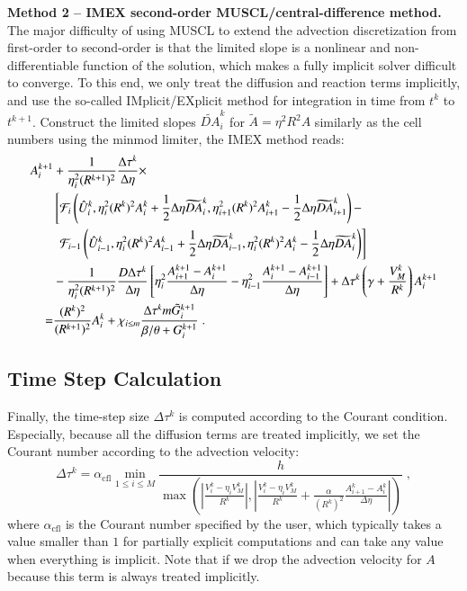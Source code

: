 \documentclass{amsart}
\theoremstyle{definition}
\theoremstyle{remark}
\numberwithin{equation}{section}
\numberwithin{figure}{section}
\newcommand{\abs}[1]{\left|#1\right|}
\begin{document}
\noindent
{\bf Method 2 -- IMEX second-order MUSCL/central-difference method.}
The major difficulty of using MUSCL to extend the advection discretization from first-order to second-order is that the limited slope is a nonlinear and non-differentiable function of the solution, which makes a fully implicit solver difficult to converge.
To this end, we only treat the diffusion and reaction terms implicitly, and use the so-called IMplicit/EXplicit method for integration in time from $t^k$ to $t^{k+1}$.
Construct the limited slopes $\widetilde{DA}^k_i$ for $\tilde{A}=\eta^2R^2A$ similarly as the cell numbers using the minmod limiter, the IMEX method reads:
\begin{align}
\label{eq:num_imex_muscl_chem}
A_i^{k+1} &+ \frac{1}{\eta_i^2(R^{k+1})^2}\frac{\Delta\tau^k}{\Delta\eta}\times \\ 
\notag
&\left[\mathcal{F}_i\left(\hat{U}_i^k,\eta_i^2(R^k)^2A_i^k+\frac{1}{2}\Delta\eta\widetilde{DA}_i^k,\eta_{i+1}^2(R^k)^2A_{i+1}^k-\frac{1}{2}\Delta\eta\widetilde{DA}_{i+1}^k\right)-\right.\\
\notag
&\ \left.\mathcal{F}_{i-1}\left(\hat{U}_{i-1}^k,\eta_i^2(R^k)^2A_{i-1}^k+\frac{1}{2}\Delta\eta\widetilde{DA}^k_{i-1},\eta_i^2(R^k)^2A_i^k-\frac{1}{2}\Delta\eta\widetilde{DA}^k_i\right)\right] \\
\notag
&-\frac{1}{\eta_i^2(R^{k+1})^2}\frac{D\Delta\tau^k}{\Delta\eta}\left[\eta_i^2\frac{A_{i+1}^{k+1}-A_i^{k+1}}{\Delta\eta}-\eta_{i-1}^2\frac{A_i^{k+1}-A_{i-1}^{k+1}}{\Delta\eta}\right] + \Delta\tau^k\left(\gamma+\frac{V_M^k}{R^k}\right)A_i^{k+1} \\
\notag
= & \frac{(R^k)^2}{(R^{k+1})^2}A_i^k + \chi_{i\le m}\frac{\Delta\tau^k m\tilde{G}_i^{k+1}}{\beta/\theta+G_i^{k+1}}\;.
\end{align}

\subsection{Time Step Calculation}
Finally, the time-step size $\Delta\tau^k$ is computed according to the Courant condition.
Especially, because all the diffusion terms are treated implicitly, we set the Courant number according to the advection velocity:
\begin{equation}\label{eq:num_dtau}
\Delta\tau^k = \alpha_{\textrm{cfl}}\min_{1\le i\le M}\frac{h}{\max(\abs{\frac{V_i^k-\eta_iV_M^k}{R^k}},\abs{\frac{V_i^k-\eta_iV_M^k}{R^k}+\frac{\alpha}{(R^k)^2}\frac{A_{i+1}^k-A_i^k}{\Delta\eta}})}\;,
\end{equation}
where $\alpha_{\textrm{cfl}}$ is the Courant number specified by the user, which typically takes a value smaller than $1$ for partially explicit computations and can take any value when everything is implicit.
Note that if we drop the advection velocity for $A$ because this term is always treated implicitly.
\end{document}
